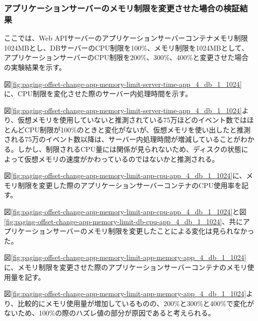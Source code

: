 \documentclass[../../../../main]{subfiles}
\begin{document}
    \subsubsection{アプリケーションサーバーのメモリ制限を変更させた場合の検証結果}\label{subsubsec:result-paging-offset-change-app-memory}

    ここでは、Web APIサーバーのアプリケーションサーバーコンテナメモリ制限1024MBとし、DBサーバーのCPU制限を100\%、メモリ制限を1024MBとして、アプリケーションサーバーのCPU制限を200\%、300\%、400\%と変更させた場合の実験結果を示す。


    図\ref{fig:paging-offset-change-app-memory-limit-server-time-app_4_db_1_1024}に、CPU制限を変化させた際のサーバー内処理時間を示す。

    

    図\ref{fig:paging-offset-change-app-memory-limit-server-time-app_4_db_1_1024}より、仮想メモリを使用していないと推測されている75万ほどのイベント数ではほとんどCPU制限が100\%のときと変化がないが、仮想メモリを使い出したと推測される75万のイベント数以降は、サーバー内処理時間が増減していることがわかる。しかし、制限されるCPU量には関係が見られないため、ディスクの状態によって仮想メモリの速度がかわっているのではないかと推測される。


    図\ref{fig:paging-offset-change-app-memory-limit-app-cpu-app_4_db_1_1024}に、メモリ制限を変更した際のアプリケーションサーバーコンテナのCPU使用率を記す。

    

    図\ref{fig:paging-offset-change-app-memory-limit-app-cpu-app_4_db_1_1024}と図\ref{fig:paging-offset-change-app-memory-limit-db-cpu-app_4_db_1_1024}、共にアプリケーションサーバーのメモリ制限を変更したことによる変化は見られなかった。


    図\ref{fig:paging-offset-change-app-memory-limit-app-memory-app_4_db_1_1024}に、メモリ制限を変更させた際のアプリケーションサーバーコンテナのメモリ使用量を記す。

    


    図\ref{fig:paging-offset-change-app-memory-limit-app-memory-app_4_db_1_1024}より、比較的にメモリ使用量が増加しているものの、200\%と300\%と400\%で変化がないため、100\%の際のハズレ値の部分が原因であると考えられる。
\end{document}
